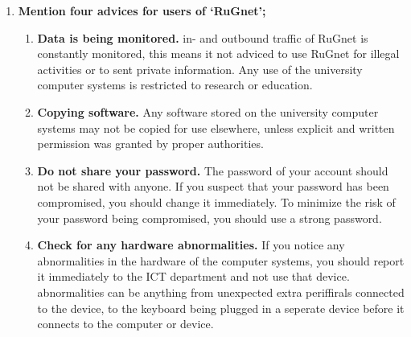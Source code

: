 \documentclass{report}
\begin{document}
\begin{enumerate}
      \item \textbf{Mention four advices for users of `RuGnet';}
            \begin{enumerate}
                  \item \textbf{Data is being monitored.}
                        in- and outbound traffic of RuGnet is constantly monitored,
                        this means it not adviced to use RuGnet for illegal activities or to sent private information.
                        Any use of the university computer systems is restricted to research or education.
                  \item \textbf{Copying software.}
                        Any software stored on the university computer systems may not be copied for use elsewhere,
                        unless explicit and written permission was granted by proper authorities.
                  \item \textbf{Do not share your password.}
                        The password of your account should not be shared with anyone.
                        If you suspect that your password has been compromised,
                        you should change it immediately. To minimize the risk of your password being compromised,
                        you should use a strong password.
                  \item \textbf{Check for any hardware abnormalities.}
                        If you notice any abnormalities in the hardware of the computer systems,
                        you should report it immediately to the ICT department and not use that device.
                        abnormalities can be anything from unexpected extra periffirals connected to the device,
                        to the keyboard being plugged in a seperate device before it connects to the computer or device.
            \end{enumerate}


\end{enumerate}
\end{document}
